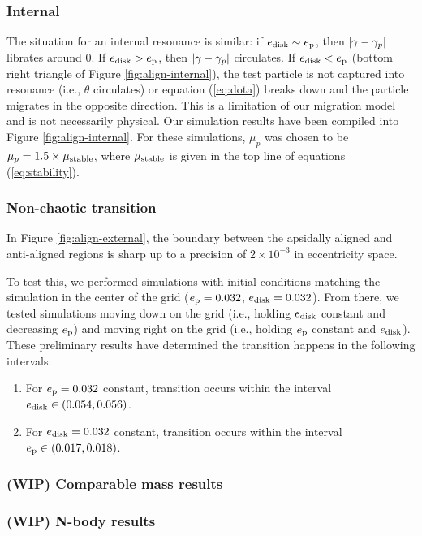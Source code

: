 \documentclass{article}
\newcommand{\edisk}{e_{\rm disk}}
\newcommand{\ep}{e_{\rm p}}
\DeclarePairedDelimiter{\abs}{|}{|}
\begin{document}
\subsubsection{Internal}
The situation for an internal resonance is similar:
if $\edisk\sim \ep$, then
$\abs{\gamma-\gamma_p}$ librates around 0.  If $\edisk>\ep$, then
$\abs{\gamma-\gamma_p}$ circulates.  If $\edisk< \ep$ (bottom right triangle of
Figure \ref{fig:align-internal}), the test particle is not captured
into resonance (i.e., $\bar{\theta}$ circulates) or equation
(\ref{eq:dota}) breaks down and the particle migrates in the opposite
direction. This is a limitation of our migration model and is not
necessarily physical. Our simulation results have been compiled into Figure
\ref{fig:align-internal}. For these simulations, $\mu_p$ was chosen
to be $\mu_p = 1.5 \times\mu_{\rm stable}$, where $\mu_{\rm stable}$
is given in the top line of equations (\ref{eq:stability}).

\subsubsection{Non-chaotic transition}
In Figure \ref{fig:align-external}, the boundary between the apsidally
aligned and anti-aligned regions is sharp up to a precision
of $2\times 10^{-3}$ in eccentricity space.

To test this, we performed simulations with initial conditions
matching the simulation in the center of the grid ($\ep = 0.032$,
$\edisk = 0.032$).  From there, we tested simulations moving down on
the grid (i.e., holding $\edisk$ constant and decreasing $\ep$) and
moving right on the grid  (i.e., holding $\ep$ constant and $\edisk$).
These preliminary results have determined the transition happens in
the following intervals:
\begin{enumerate}
\item For $\ep = 0.032$ constant, transition occurs within the interval
  $\edisk \in (0.054, 0.056)$.
\item For $\edisk = 0.032$ constant, transition occurs within the interval
  $\ep \in (0.017, 0.018)$.
\end{enumerate}
\subsubsection{(WIP) Comparable mass results}
\subsubsection{(WIP) N-body results} 
\end{document}
